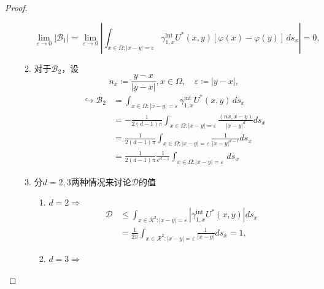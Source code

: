 \begin{proof}
\begin{enumerate}
\begin{enumerate}
\begin{equation*}
  \lim_{\varepsilon \rightarrow 0} \left| \mathcal{B}_{1} \right| = \lim_{\varepsilon \rightarrow 0}
  \left|
  \int_{x \in \Omega: \left| x - y \right| = \varepsilon}
  \gamma_{1,x}^{\text{int}} U^{*}(x,y)
  \left[ \varphi(x) - \varphi(y) \right] \, d s_x
  \right|
  = 0,
\end{equation*}
\item 对于$\mathcal{B}_{2}$，设
\begin{equation*}
  n_x \coloneqq \frac{y - x}{\left| y - x \right|}, x \in \Omega, \quad \varepsilon \coloneqq \left| y - x \right| ,
\end{equation*}
\begin{equation*}
  \begin{split}
    \hookrightarrow
    \mathcal{B}_{2} &= \int_{x \in \Omega: \left| x - y \right| = \varepsilon}
    \gamma_{1,x}^{\text{int}} U^{*}(x,y) \, d s_x \\
    & = - \frac{1}{2(d-1) \pi}
    \int_{x \in \Omega: \left| x - y \right| = \varepsilon}
    \frac{
    (nx, x-y)
    }{
    \left| x - y \right|^d
    }
    d s_x \\
    & = \frac{1}{2(d-1) \pi}
    \int_{x \in \Omega: \left| x - y \right| = \varepsilon}
    \frac{1}{
    \left|
    x - y
    \right|^{d-1}
    }
    d s_x \\
    & = \frac{1}{2(d-1) \pi}
    \frac{1}{\varepsilon^{d-1}}
    \int_{x \in \Omega: \left| x - y \right| = \varepsilon}
    \, d s_x
  \end{split}
\end{equation*}
\item 分$d=2,3$两种情况来讨论$\mathcal{D}$的值
\begin{enumerate}
  \item $d = 2 \Rightarrow$
  \begin{equation*}
    \begin{split}
      \mathcal{D} &\le
      \int_{x \in \mathcal{R}^2:\left| x - y \right| = \varepsilon}
      \left|
      \gamma_{1,x}^{\text{int}} U^{*}(x,y)
      \right|
      d s_x \\
      & = \frac{1}{2\pi}
      \int_{x \in \mathcal{R}^2:\left| x - y \right| = \varepsilon}
      \frac{1}{\left| x - y \right|}
      d s_x = 1,
    \end{split}
  \end{equation*}
  \item $d = 3 \Rightarrow$
  \begin{equation*}
    \begin{split}

\end{split}
\end{equation*}
\end{enumerate}
\end{enumerate}
\end{enumerate}
\end{proof}
